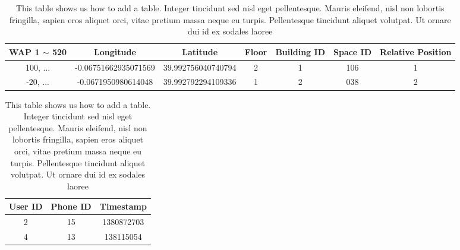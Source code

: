 \begin{table}[htbp]

\small
\setlength\tabcolsep{2pt}

\begin{tabular}{|c|c|c|c|c|c|c|}
\hline
WAP 1 $\sim$ 520 & Longitude            & Latitude           & Floor & Building ID & Space ID & Relative Position  \\ \hline
100, ...         & -0.06751662935071569 & 39.992756040740794 & 2     & 1           & 106      & 1                  \\ \hline
-20, ...         & -0.0671950980614048  & 39.992792294109336 & 1     & 2           & 038      & 2                  \\ \hline
\end{tabular}

\vspace{5mm}

\begin{tabular}{|c|c|c|}
\hline
User ID & Phone ID & Timestamp  \\ \hline
2       & 15       & 1380872703  \\ \hline
4       & 13       & 138115054   \\ \hline
\end{tabular}

\caption[short table caption]{This table shows us how to add a table. Integer tincidunt sed nisl eget pellentesque. Mauris
eleifend, nisl non lobortis fringilla, sapien eros aliquet orci, vitae pretium massa neque eu turpis. Pellentesque tincidunt
aliquet volutpat. Ut ornare dui id ex sodales laoree}
\label{table:mytable}

\end{table}
